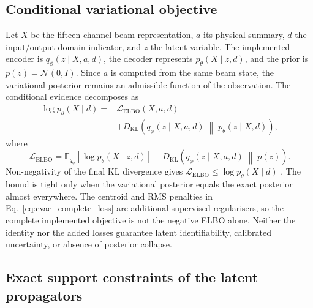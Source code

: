 \documentclass[11pt,a4paper]{article}
\providecommand{\E}{\mathbb{E}}
\providecommand{\KL}{D_{\mathrm{KL}}}
\begin{document}
\begin{sloppypar}
\subsection{Conditional variational objective}

Let \(X\) be the fifteen-channel beam representation, \(a\) its physical summary, \(d\) the input/output-domain indicator, and \(z\) the latent variable. The implemented encoder is \(q_{\phi}(z\mid X,a,d)\), the decoder represents \(p_{\theta}(X\mid z,d)\), and the prior is \(p(z)=\mathcal{N}(0,I)\). Since \(a\) is computed from the same beam state, the variational posterior remains an admissible function of the observation. The conditional evidence decomposes as
\begin{align}
    \log p_{\theta}(X\mid d)
    ={}&
    \mathcal{L}_{\mathrm{ELBO}}(X,a,d)
    \\
    &+
    \KL\!\left(
        q_{\phi}(z\mid X,a,d)
        \;\middle\|\;
        p_{\theta}(z\mid X,d)
    \right),
    \label{eq:app_elbo_identity}
\end{align}
where
\begin{equation}
    \mathcal{L}_{\mathrm{ELBO}}
    =
    \E_{q_{\phi}}
    \left[
        \log p_{\theta}(X\mid z,d)
    \right]
    -
    \KL\!\left(
        q_{\phi}(z\mid X,a,d)
        \;\middle\|\;
        p(z)
    \right).
    \label{eq:app_elbo}
\end{equation}
Non-negativity of the final KL divergence gives \(\mathcal{L}_{\mathrm{ELBO}}\leq\log p_{\theta}(X\mid d)\) \cite{kingma_autoencoding_2014,sohn_cvae_2015}. The bound is tight only when the variational posterior equals the exact posterior almost everywhere. The centroid and RMS penalties in Eq.~\eqref{eq:cvae_complete_loss} are additional supervised regularisers, so the complete implemented objective is not the negative ELBO alone. Neither the identity nor the added losses guarantee latent identifiability, calibrated uncertainty, or absence of posterior collapse.

\subsection{Exact support constraints of the latent propagators}


\end{sloppypar}
\end{document}
